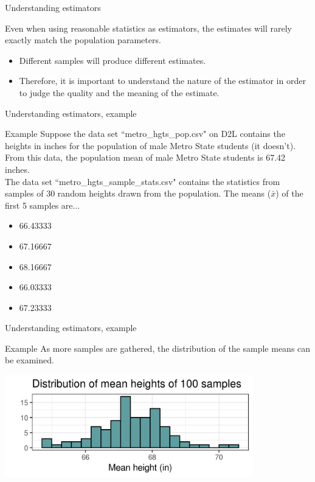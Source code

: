\documentclass[xcolor=table, aspectratio=169, bigger]{beamer}
\begin{document}
\begin{frame}{Understanding estimators}
\begin{block}{}
Even when using reasonable statistics as estimators, the estimates will rarely exactly match the population parameters.

\begin{itemize}
\item Different samples will produce different estimates.
\item Therefore, it is important to understand the nature of the estimator in order to judge the quality and the meaning of the estimate.
\end{itemize}
\end{block}
\end{frame}

\begin{frame}{Understanding estimators, example}
\begin{exampleblock}{Example}
Suppose the data set ``metro\_hgts\_pop.csv" on D2L contains the heights in inches for the population of male Metro State students (it doesn't). From this data, the population mean of male Metro State students is 67.42 inches.\\ \medskip
\pause
The data set ``metro\_hgts\_sample\_stats.csv" contains the statistics from samples of 30 random heights drawn from the population. The means ($\bar x$) of the first 5 samples are...\\ \smallskip
\begin{itemize}
\pause\item 66.43333 
\pause\item 67.16667 
\pause\item 68.16667 
\pause\item 66.03333 
\pause\item 67.23333
\end{itemize}
 
\end{exampleblock}
\end{frame}

\begin{frame}{Understanding estimators, example}
\begin{exampleblock}{Example}
As more samples are gathered, the distribution of the sample means can be examined.
\end{exampleblock}
\bigskip
{\centering
\includegraphics[width=4.25in]{../images/wk07_metro_hgts_hist}
\par}

\end{frame}
\end{document}
